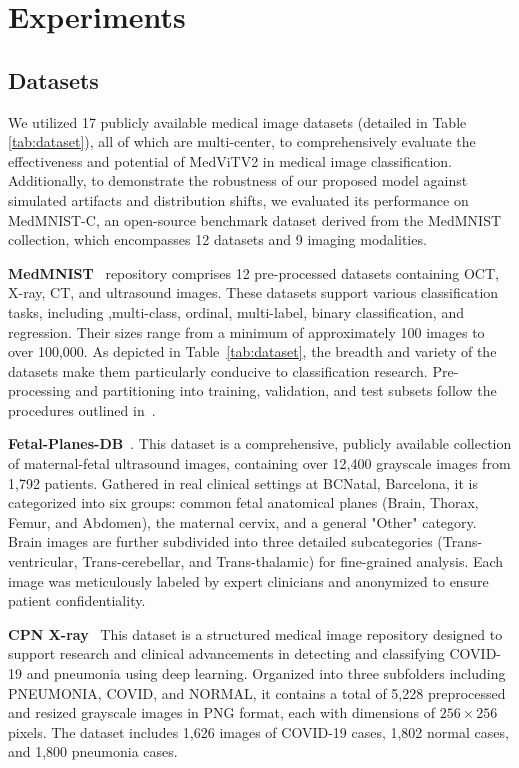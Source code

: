 \documentclass[times,twocolumn,final]{elsarticle}
\begin{document}
\section{Experiments}
\subsection{Datasets}
We utilized 17 publicly available medical image datasets (detailed in Table \ref{tab:dataset}), all of which are multi-center, to comprehensively evaluate the effectiveness and potential of MedViTV2 in medical image classification. Additionally, to demonstrate the robustness of our proposed model against simulated artifacts and distribution shifts, we evaluated its performance on MedMNIST-C, an open-source benchmark dataset derived from the MedMNIST collection, which encompasses 12 datasets and 9 imaging modalities.

\textbf{MedMNIST}~\cite{yang2023medmnist} repository comprises 12 pre-processed datasets containing OCT, X-ray, CT, and ultrasound images. These datasets support various classification tasks, including  ,multi-class, ordinal, multi-label, binary classification, and regression. Their sizes range from a minimum of approximately 100 images to over 100,000. As depicted in Table~\ref{tab:dataset}, the breadth and variety of the datasets make them particularly conducive to classification research. Pre-processing and partitioning into training, validation, and test subsets follow the procedures outlined in~\cite{yang2021medmnist}.

\textbf{Fetal-Planes-DB}~\cite{burgos2020evaluation}. This dataset is a comprehensive, publicly available collection of maternal-fetal ultrasound images, containing over 12,400 grayscale images from 1,792 patients. Gathered in real clinical settings at BCNatal, Barcelona, it is categorized into six groups: common fetal anatomical planes (Brain, Thorax, Femur, and Abdomen), the maternal cervix, and a general "Other" category. Brain images are further subdivided into three detailed subcategories (Trans-ventricular, Trans-cerebellar, and Trans-thalamic) for fine-grained analysis. Each image was meticulously labeled by expert clinicians and anonymized to ensure patient confidentiality.

\textbf{CPN X-ray}~\cite{kumar2022litecovidnet, shastri2022cheximagenet} This dataset is a structured medical image repository designed to support research and clinical advancements in detecting and classifying COVID-19 and pneumonia using deep learning. Organized into three subfolders including PNEUMONIA, COVID, and NORMAL, it contains a total of 5,228 preprocessed and resized grayscale images in PNG format, each with dimensions of $256\times256$ pixels. The dataset includes 1,626 images of COVID-19 cases, 1,802 normal cases, and 1,800 pneumonia cases.
\end{document}
